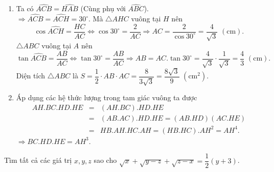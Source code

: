 \begin{ex}
{\begin{enumerate}
{
}
\item Ta có $\widehat{ACB}=\widehat{HAB}$ (Cùng phụ với $\widehat{ABC}$).\\
$\Rightarrow \widehat{ACB}=\widehat{ACH}=30^{\circ}$. Mà $\triangle AHC$ vuông tại $H$ nên
$$\cos\widehat{ACH}=\dfrac{HC}{AC}\Leftrightarrow \cos 30^{\circ}=\dfrac{2}{AC}\Rightarrow AC=\dfrac{2}{\cos 30^{\circ}}=\dfrac{4}{\sqrt{3}}\,\,\mathrm{(cm)}.$$
$\triangle ABC$ vuông tại $A$ nên
$$\tan \widehat{ACB}=\dfrac{AB}{AC}\Leftrightarrow \tan 30^{\circ}=\dfrac{AB}{AC}\Rightarrow AB=AC.\tan 30^{\circ}=\dfrac{4}{\sqrt{3}}\cdot \dfrac{1}{\sqrt{3}}=\dfrac{4}{3}\,\,\mathrm{(cm)}.$$
Diện tích $\triangle ABC$ là $S=\dfrac{1}{2}\cdot AB\cdot AC=\dfrac{8}{3\sqrt{3}}=\dfrac{8\sqrt{3}}{9}\,\, (\mathrm{cm}^2)$.
\item Áp dụng các hệ thức lượng trong tam giác vuông ta được
\begin{eqnarray*}
AH.BC.HD.HE & = & (AH.BC).HD.HE\\
& = & (AB.AC).HD.HE = (AB.HD)(AC.HE)\\
& = & HB.AH.HC.AH=(HB.HC).AH^2=AH^4.
\end{eqnarray*}
$\Rightarrow BC.HD.HE=AH^3$.
\end{enumerate}
}

\end{ex}

\begin{ex}%
Tìm tất cả các giá trị $x,y,z$ sao cho $\sqrt{x}+\sqrt{y-z}+\sqrt{z-x}=\dfrac{1}{2}(y+3)$.
\end{ex}

